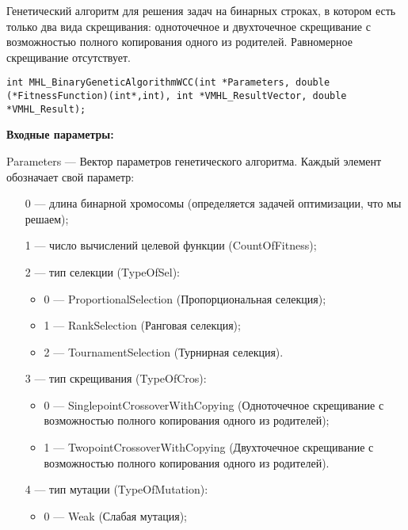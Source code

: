 \documentclass[a4paper,12pt]{article}
\begin{document}
Генетический алгоритм для решения задач на бинарных строках, в котором есть только два вида скрещивания: одноточечное и двухточечное скрещивание с возможностью полного копирования одного из родителей. Равномерное скрещивание отсутствует.


\begin{lstlisting}[label=code_syntax_MHL_BinaryGeneticAlgorithmWCC,caption=Синтаксис]
int MHL_BinaryGeneticAlgorithmWCC(int *Parameters, double (*FitnessFunction)(int*,int), int *VMHL_ResultVector, double *VMHL_Result);
\end{lstlisting}

\textbf{Входные параметры:}
 
Parameters --- Вектор параметров генетического алгоритма. Каждый элемент обозначает свой параметр:
 
 \begin{itemize}
 \item [0] --- длина бинарной хромосомы (определяется задачей оптимизации, что мы решаем);
 
 \item [1] --- число вычислений целевой функции (CountOfFitness);
 
 \item [2] --- тип селекции (TypeOfSel):
 
 \begin{itemize}
       \item 0 --- ProportionalSelection (Пропорциональная селекция);
 
       \item 1 --- RankSelection (Ранговая селекция);
 
       \item 2 --- TournamentSelection (Турнирная селекция).
	    \end{itemize}
 
 \item [3] --- тип скрещивания (TypeOfCros):
  \begin{itemize}
       \item 0 --- SinglepointCrossoverWithCopying (Одноточечное скрещивание с возможностью полного копирования одного из родителей);
 
       \item 1 --- TwopointCrossoverWithCopying (Двухточечное скрещивание с возможностью полного копирования одного из родителей).
	    \end{itemize}
 
 \item [4] --- тип мутации (TypeOfMutation):
  \begin{itemize}
       \item 0 --- Weak (Слабая мутация);
 

\end{itemize}
\end{itemize}
\end{document}
